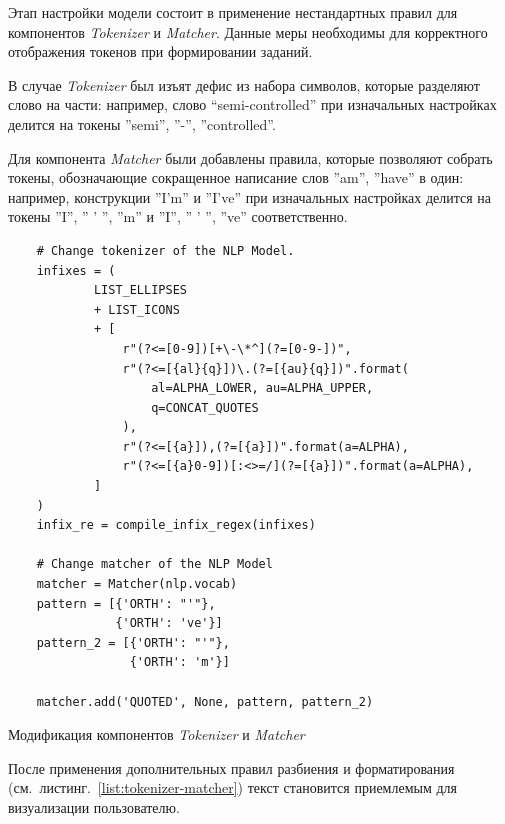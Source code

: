 Этап настройки модели состоит в применение нестандартных правил для компонентов \emph{Tokenizer} и \emph{Matcher}. Данные меры необходимы для корректного отображения токенов при формировании заданий. 

В случае \emph{Tokenizer} был изъят дефис из набора символов, которые разделяют слово на части: например, слово “semi-controlled” при изначальных настройках делится на токены ''semi'', ''-'', ''controlled”.


Для компонента \emph{Matcher} были добавлены правила, которые позволяют собрать токены, обозначающие сокращенное написание слов ''am'', ''have'' в один: например, конструкции ''I’m'' и ''I've'' при изначальных настройках делится на токены ''I'', '' ' '', ''m'' и ''I'', '' ' '', ''ve'' соответственно. 


\begin{ListingEnv}[h]
\begin{lstlisting}
    # Change tokenizer of the NLP Model.
    infixes = (
            LIST_ELLIPSES
            + LIST_ICONS
            + [
                r"(?<=[0-9])[+\-\*^](?=[0-9-])",
                r"(?<=[{al}{q}])\.(?=[{au}{q}])".format(
                    al=ALPHA_LOWER, au=ALPHA_UPPER,
                    q=CONCAT_QUOTES
                ),
                r"(?<=[{a}]),(?=[{a}])".format(a=ALPHA),
                r"(?<=[{a}0-9])[:<>=/](?=[{a}])".format(a=ALPHA),
            ]
    )
    infix_re = compile_infix_regex(infixes)

    # Change matcher of the NLP Model
    matcher = Matcher(nlp.vocab)
    pattern = [{'ORTH': "'"},
               {'ORTH': 've'}]
    pattern_2 = [{'ORTH': "'"},
                 {'ORTH': 'm'}]

    matcher.add('QUOTED', None, pattern, pattern_2)
\end{lstlisting}
\caption{Модификация компонентов \emph{Tokenizer} и  \emph{Matcher}}
\label{list:tokenizer-matcher}
\end{ListingEnv}

После применения дополнительных правил разбиения и форматирования (см.~листинг.~\ref{list:tokenizer-matcher}) текст становится приемлемым для визуализации пользователю.


